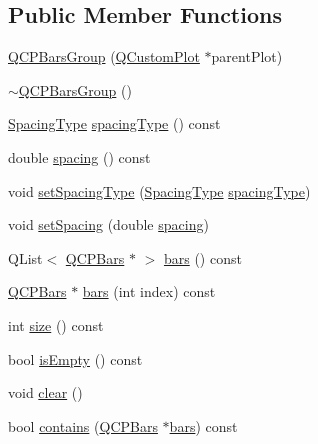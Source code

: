 \subsection*{Public Member Functions}
\begin{DoxyCompactItemize}
\item 
\hyperlink{class_q_c_p_bars_group_aa4e043b9a22c6c5ea0f93740aca063e1}{Q\+C\+P\+Bars\+Group} (\hyperlink{class_q_custom_plot}{Q\+Custom\+Plot} $\ast$parent\+Plot)
\item 
\hyperlink{class_q_c_p_bars_group_adb9475bcb6a5f18c8918e17d939d8dbd}{$\sim$\+Q\+C\+P\+Bars\+Group} ()
\item 
\hyperlink{class_q_c_p_bars_group_a4c0521120a97e60bbca37677a37075b6}{Spacing\+Type} \hyperlink{class_q_c_p_bars_group_a1bb562f669d47bd7d3cdd2da1f7d8f00}{spacing\+Type} () const 
\item 
double \hyperlink{class_q_c_p_bars_group_a730bffefcac6c97aaf60e6f64dd3bcd9}{spacing} () const 
\item 
void \hyperlink{class_q_c_p_bars_group_a2c7e2d61b10594a4555b615e1fcaf49e}{set\+Spacing\+Type} (\hyperlink{class_q_c_p_bars_group_a4c0521120a97e60bbca37677a37075b6}{Spacing\+Type} \hyperlink{class_q_c_p_bars_group_a1bb562f669d47bd7d3cdd2da1f7d8f00}{spacing\+Type})
\item 
void \hyperlink{class_q_c_p_bars_group_aa553d327479d72a0c3dafcc724a190e2}{set\+Spacing} (double \hyperlink{class_q_c_p_bars_group_a730bffefcac6c97aaf60e6f64dd3bcd9}{spacing})
\item 
Q\+List$<$ \hyperlink{class_q_c_p_bars}{Q\+C\+P\+Bars} $\ast$ $>$ \hyperlink{class_q_c_p_bars_group_a7c72ed1f8cd962c93b8c42ab96cd91ec}{bars} () const 
\item 
\hyperlink{class_q_c_p_bars}{Q\+C\+P\+Bars} $\ast$ \hyperlink{class_q_c_p_bars_group_a72d022790b7c93151c95c28eefaf51b4}{bars} (int index) const 
\item 
int \hyperlink{class_q_c_p_bars_group_af07364189c5717a158ec95b609687532}{size} () const 
\item 
bool \hyperlink{class_q_c_p_bars_group_a1d89da4e9176f4f77105e9a4afd44e2b}{is\+Empty} () const 
\item 
void \hyperlink{class_q_c_p_bars_group_a3ddf23928c6cd89530bd34ab7ba7b177}{clear} ()
\item 
bool \hyperlink{class_q_c_p_bars_group_adb4837894167e629e42e200db056fac3}{contains} (\hyperlink{class_q_c_p_bars}{Q\+C\+P\+Bars} $\ast$\hyperlink{class_q_c_p_bars_group_a7c72ed1f8cd962c93b8c42ab96cd91ec}{bars}) const 
\item 

\end{DoxyCompactItemize}
